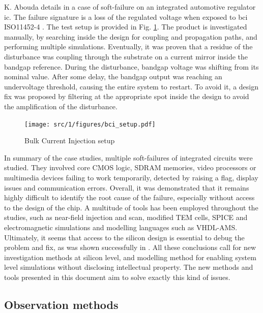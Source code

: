 K. Abouda details in \cite{softfailEMCIC} a case of soft-failure on an integrated automotive regulator \gls{ic}.
The failure signature is a loss of the regulated voltage when exposed to \gls{bci} ISO11452-4 \cite{iso11452}.
The test setup is provided in Fig. \ref{fig:bci-setup}.
The product is investigated manually, by searching inside the design for coupling and propagation paths, and performing multiple simulations.
Eventually, it was proven that a residue of the disturbance was coupling through the substrate on a current mirror inside the bandgap reference.
During the disturbance, bandgap voltage was shifting from its nominal value.
After some delay, the bandgap output was reaching an undervoltage threshold, causing the entire system to restart.
To avoid it, a design fix was proposed by filtering at the appropriate spot inside the design to avoid the amplification of the disturbance.

\begin{figure}[!h]
  \centering
  \texttt{[image: src/1/figures/bci\_setup.pdf]}
  \caption{Bulk Current Injection setup}
  \label{fig:bci-setup}
\end{figure}

In summary of the case studies, multiple soft-failures of integrated circuits were studied.
They involved core CMOS logic, SDRAM memories, video processors or multimedia devices failing to work temporarily, detected by raising a flag, display issues and communication errors.
Overall, it was demonstrated that it remains highly difficult to identify the root cause of the failure, especially without access to the design of the chip.
A multitude of tools has been employed throughout the studies, such as near-field injection and scan, modified TEM cells, SPICE and electromagnetic simulations and modelling languages such as VHDL-AMS.
Ultimately, it seems that access to the silicon design is essential to debug the problem and fix, as was shown successfully in \cite{softfailEMCIC}.
All these conclusions call for new investigation methods at silicon level, and modelling method for enabling system level simulations without disclosing intellectual property.
The new methods and tools presented in this document aim to solve exactly this kind of issues. 

\subsection{Observation methods}

